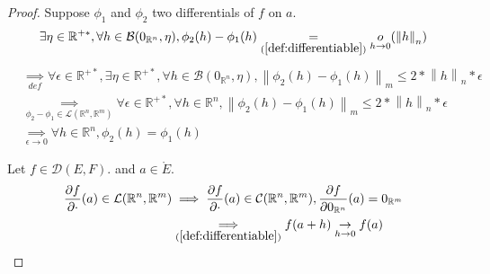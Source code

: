 \documentclass[11pt,en]{elegantpaper}
\newcommand{\norm}[1]{\left\lVert#1\right\rVert}
\newcommand{\Real}{\mathbb{R}}
\begin{document}
\begin{proof}
  Suppose $\phi_1$ and $\phi_2$ two differentials of $f$ on $a$. \begin{equation*}
    \begin{gathered}
      \exists \eta \in \Real^{+*}, \forall h \in \mathcal{B}(0_{\Real^n},\eta), \phi_2(h) - \phi_1(h) \underset{(\ref{def:differentiable})} = \underset{h \to 0}o(\norm h _n)
    \end{gathered}
  \end{equation*}
  \begin{equation*}
    \begin{split}
      & \underset{def} \implies \forall \epsilon \in \Real^{+*}, \exists \eta \in \Real^{+*}, \forall h \in \mathcal{B}(0_{\Real^n},\eta), \norm{\phi_2(h) - \phi_1(h)}_m \leq 2 * \norm h _n * \epsilon \\
      & \underset{\phi_2 - \phi_1 \in \mathcal{L}(\Real^n,\Real^m)} \implies \forall \epsilon \in \Real^{+*}, \forall h \in \Real^n, \norm{\phi_2(h) - \phi_1(h)}_m \leq 2 * \norm h _n * \epsilon \\
      & \underset{\epsilon \to 0} \implies \forall h \in \Real^n, \phi_2(h) = \phi_1(h)
    \end{split}
  \end{equation*}
  
  Let $f \in \mathcal{D}(E,F).$ and $a \in \mathring{E}$. \begin{equation*}
    \begin{split}
      \frac{\partial f}{\partial \cdot}(a) \in \mathcal{L}(\Real^n,\Real^m) & \implies \frac{\partial f}{\partial \cdot}(a) \in \mathcal{C}(\Real^n,\Real^m), \frac{\partial f}{\partial 0_{\Real^n}}(a) = 0_{\Real^m} \\
      & \underset{(\ref{def:differentiable})} \implies f(a + h) \underset{h \to 0} \to f(a)
    \end{split}
  \end{equation*}
\end{proof}
\end{document}
